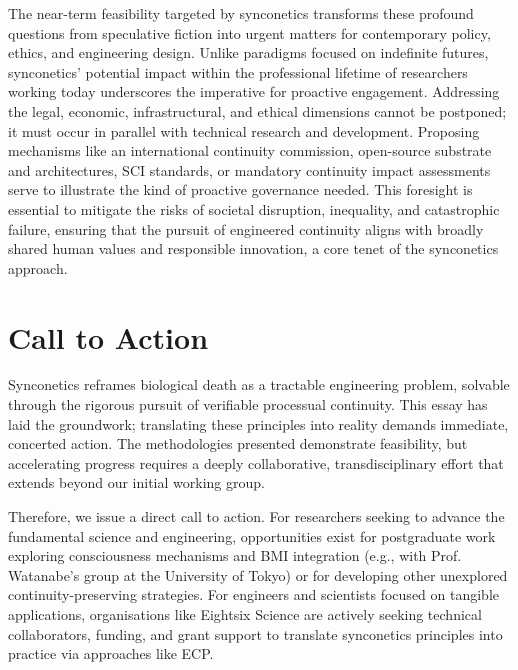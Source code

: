 \documentclass[10pt]{article}
\begin{document}
\begin{sloppypar}

  The near-term feasibility targeted by synconetics transforms these profound questions from speculative fiction into urgent matters for contemporary policy, ethics, and engineering design. Unlike paradigms focused on indefinite futures, synconetics’ potential impact within the professional lifetime of researchers working today underscores the imperative for proactive engagement. Addressing the legal, economic, infrastructural, and ethical dimensions cannot be postponed; it must occur in parallel with technical research and development. Proposing mechanisms like an international continuity commission, open-source substrate and architectures, SCI standards, or mandatory continuity impact assessments serve to illustrate the kind of proactive governance needed. This foresight is essential to mitigate the risks of societal disruption, inequality, and catastrophic failure, ensuring that the pursuit of engineered continuity aligns with broadly shared human values and responsible innovation, a core tenet of the synconetics approach.


  \section{Call to Action}
  \label{sec:call-to-action}

  Synconetics reframes biological death as a tractable engineering problem, solvable through the rigorous pursuit of verifiable processual continuity. This essay has laid the groundwork; translating these principles into reality demands immediate, concerted action. The methodologies presented demonstrate feasibility, but accelerating progress requires a deeply collaborative, transdisciplinary effort that extends beyond our initial working group.

  Therefore, we issue a direct call to action. For researchers seeking to advance the fundamental science and engineering, opportunities exist for postgraduate work exploring consciousness mechanisms and BMI integration (e.g., with Prof. Watanabe’s group at the University of Tokyo) or for developing other unexplored continuity-preserving strategies. For engineers and scientists focused on tangible applications, organisations like Eightsix Science are actively seeking technical collaborators, funding, and grant support to translate synconetics principles into practice via approaches like ECP.


\end{sloppypar}
\end{document}
